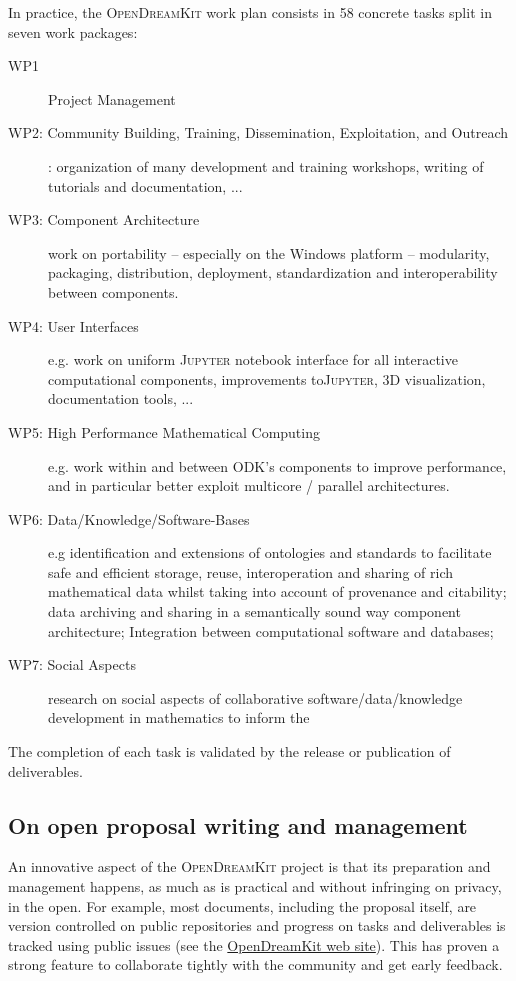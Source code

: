 \documentclass{llncs}
\newcommand{\software}[1]{\textsc{#1}\xspace}
\newcommand{\Jupyter}{\software{Jupyter}}
\newcommand{\ODK}{\software{OpenDreamKit}}
\begin{document}

In practice, the \ODK work plan consists in 58 concrete tasks split in
seven work packages:
\begin{description}
\item[WP1] Project Management
\item[WP2: Community Building, Training, Dissemination, Exploitation,
  and Outreach]: organization of many development and training
  workshops, writing of tutorials and documentation, ...
\item[WP3: Component Architecture] work on portability -- especially
  on the Windows platform -- modularity, packaging, distribution,
  deployment, standardization and interoperability between components.
\item[WP4: User Interfaces] e.g. work on uniform \Jupyter notebook
  interface for all interactive computational components, improvements
  to\Jupyter, 3D visualization, documentation tools, ...
\item[WP5: High Performance Mathematical Computing] e.g. work within
  and between ODK's components to improve performance, and in
  particular better exploit multicore / parallel architectures.
\item[WP6: Data/Knowledge/Software-Bases] e.g identification and
  extensions of ontologies and standards to facilitate safe and
  efficient storage, reuse, interoperation and sharing of rich
  mathematical data whilst taking into account of provenance and
  citability; data archiving and sharing in a semantically sound way
  component architecture; Integration between computational software and databases;
\item[WP7: Social Aspects] research on social aspects of collaborative
  software/data/knowledge development in mathematics to inform the 
\end{description}
The completion of each task is validated by the release or publication
of deliverables.


\subsection{On open proposal writing and management}

An innovative aspect of the \ODK project is that its preparation and
management happens, as much as is practical and without infringing on
privacy, in the open. For example, most documents, including the
proposal itself, are version controlled on public repositories and
progress on tasks and deliverables is tracked using public issues (see
the \href{http://opendreamkit.org/}{OpenDreamKit web site}). This has
proven a strong feature to collaborate tightly with the community and
get early feedback.
\end{document}
